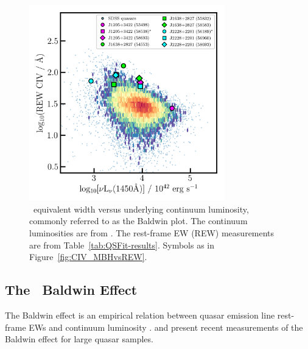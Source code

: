 \documentclass[fleqn,usenatbib]{mnras}
\begin{document}
\begin{table}
  \caption{Virial Mass estimates, bolometric luminosities and Eddington ratios for the
    three quasars. 
    $\dagger$From the \citet{Shen2011} SDSS DR7 Quasar catalog.
    $\ddagger$From the \citet{Kozlowski2017} SDSS-III BOSS DR12 quasar catalog.
    We scale these values using
    our measured $\nu L_{\nu}$ continuum luminosity values.  From
    Section~\ref{sec:BH_masses}, we assume: $\log(M_{\rm BH,
      vir}/M_{\odot}) = 9.726$ for J1205+3422; $\log(M_{\rm BH,
      vir}/M_{\odot}) = 9.091$ for J1638+2827, and $\log(M_{\rm BH,
      vir}/M_{\odot}) = 9.366$ for J2228+2201.  The Eddington luminosity
    $L_{\rm Edd} = 1.26\times10^{38} (M_{\rm BH}/M_{\odot})$ erg s$^{-1}$
    and $\eta_{\rm Edd}$ is the log of the Eddington ratio.}
\label{tab:Eddington_ratios} 
\end{table}


\begin{figure}
  \centering
  \includegraphics[width=8.5cm, trim=0.2cm 0.2cm 0.0cm 0.2cm, clip]{figures/CIV_CLQs_Baldwin_20200519.png}
   \vspace{-12pt}
   \caption[]{\civ\ equivalent width versus underlying continuum luminosity,
     commonly referred to as the Baldwin plot.  The continuum luminosities
     are from \citet{Calderone2017}.  The rest-frame EW (REW) measurements
     are from Table~\ref{tab:QSFit-results}.  Symbols as in
     Figure~\ref{fig:CIV_MBHvsREW}.
   }
  \label{fig:CIV_Baldwin}
\end{figure}

\subsection{The \civ\ Baldwin Effect}
The Baldwin effect \citep{Baldwin1977} is an empirical relation
between quasar emission line rest-frame EWs and continuum luminosity
\citep[e.g.,][]{Shields2007, Hamann2017, Calderone2017}.
\citet{Hamann2017} and \citet{Calderone2017} present recent
measurements of the Baldwin effect for large quasar samples.
\end{document}
